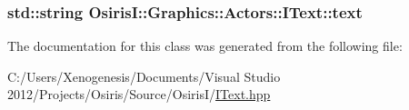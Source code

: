 \hypertarget{class_osiris_i_1_1_graphics_1_1_actors_1_1_i_text_ac61379d2b25119354434d62ba327d882}{
\subsubsection[{text}]{\setlength{\rightskip}{0pt plus 5cm}std\-::string Osiris\-I\-::\-Graphics\-::\-Actors\-::\-I\-Text\-::text\hspace{0.3cm}{\ttfamily [protected]}}}\label{class_osiris_i_1_1_graphics_1_1_actors_1_1_i_text_ac61379d2b25119354434d62ba327d882}


The documentation for this class was generated from the following file\-:\begin{DoxyCompactItemize}
\item 
C\-:/\-Users/\-Xenogenesis/\-Documents/\-Visual Studio 2012/\-Projects/\-Osiris/\-Source/\-Osiris\-I/\hyperlink{_i_text_8hpp}{I\-Text.\-hpp}\end{DoxyCompactItemize}
